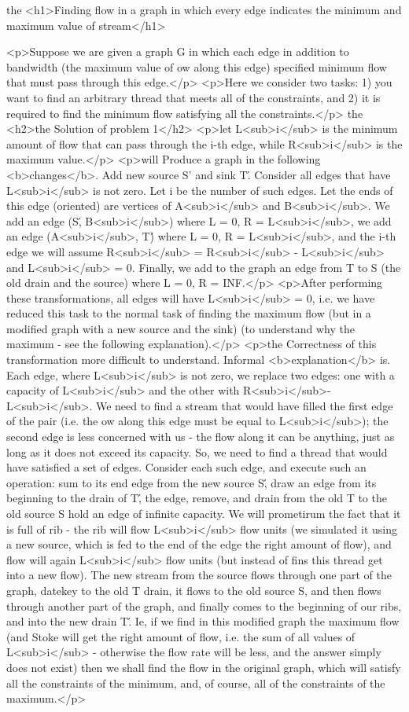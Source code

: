 the <h1>Finding flow in a graph in which every edge indicates the minimum and maximum value of stream</h1>

<p>Suppose we are given a graph G in which each edge in addition to bandwidth (the maximum value of ow along this edge) specified minimum flow that must pass through this edge.</p>
<p>Here we consider two tasks: 1) you want to find an arbitrary thread that meets all of the constraints, and 2) it is required to find the minimum flow satisfying all the constraints.</p>
the <h2>the Solution of problem 1</h2>
<p>let L<sub>i</sub> is the minimum amount of flow that can pass through the i-th edge, while R<sub>i</sub> is the maximum value.</p>
<p>will Produce a graph in the following <b>changes</b>. Add new source S' and sink T\'. Consider all edges that have L<sub>i</sub> is not zero. Let i be the number of such edges. Let the ends of this edge (oriented) are vertices of A<sub>i</sub> and B<sub>i</sub>. We add an edge (S\', B<sub>i</sub>) where L = 0, R = L<sub>i</sub>, we add an edge (A<sub>i</sub>, T\') where L = 0, R = L<sub>i</sub>, and the i-th edge we will assume R<sub>i</sub> = R<sub>i</sub> - L<sub>i</sub> and L<sub>i</sub> = 0. Finally, we add to the graph an edge from T to S (the old drain and the source) where L = 0, R = INF.</p>
<p>After performing these transformations, all edges will have L<sub>i</sub> = 0, i.e. we have reduced this task to the normal task of finding the maximum flow (but in a modified graph with a new source and the sink) (to understand why the maximum - see the following explanation).</p>
<p>the Correctness of this transformation more difficult to understand. Informal <b>explanation</b> is. Each edge, where L<sub>i</sub> is not zero, we replace two edges: one with a capacity of L<sub>i</sub> and the other with R<sub>i</sub>-L<sub>i</sub>. We need to find a stream that would have filled the first edge of the pair (i.e. the ow along this edge must be equal to L<sub>i</sub>); the second edge is less concerned with us - the flow along it can be anything, just as long as it does not exceed its capacity. So, we need to find a thread that would have satisfied a set of edges. Consider each such edge, and execute such an operation: sum to its end edge from the new source S\', draw an edge from its beginning to the drain of T\', the edge, remove, and drain from the old T to the old source S hold an edge of infinite capacity. We will prometirum the fact that it is full of rib - the rib will flow L<sub>i</sub> flow units (we simulated it using a new source, which is fed to the end of the edge the right amount of flow), and flow will again L<sub>i</sub> flow units (but instead of fins this thread get into a new flow). The new stream from the source flows through one part of the graph, datekey to the old T drain, it flows to the old source S, and then flows through another part of the graph, and finally comes to the beginning of our ribs, and into the new drain T\'. Ie, if we find in this modified graph the maximum flow (and Stoke will get the right amount of flow, i.e. the sum of all values of L<sub>i</sub> - otherwise the flow rate will be less, and the answer simply does not exist) then we shall find the flow in the original graph, which will satisfy all the constraints of the minimum, and, of course, all of the constraints of the maximum.</p>
